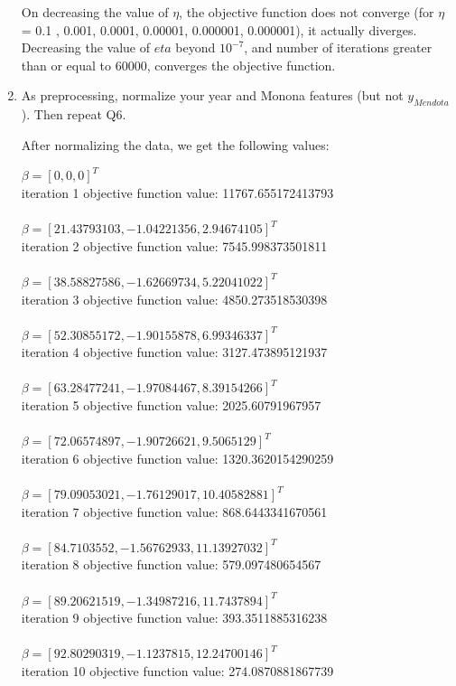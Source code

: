 \documentclass[a4paper]{article}
\theoremstyle{definition}
\newenvironment{soln}{
    \leavevmode\color{blue}\ignorespaces
}{}
\begin{document}
\begin{enumerate}
\begin{soln}
On decreasing the value of $\eta$, the objective function does not converge (for $\eta$ = 0.1 , 0.001, 0.0001, 0.00001, 0.000001, 0.000001), it actually diverges. Decreasing the value of $eta$ beyond $10^{-7}$, and number of iterations greater than or equal to 60000, converges the objective function.
	
\end{soln}

\item
As preprocessing, normalize your year and Monona features (but not $y_{Mendota}$).
Then repeat Q6.

\begin{soln}

After normalizing the data, we get the following values:

$\beta = [0,0,0]^T$\\
iteration 1 objective function value: 11767.655172413793\\
\\
$\beta = [21.43793103, -1.04221356,  2.94674105]^T$\\
iteration 2 objective function value:  7545.998373501811\\
\\
$\beta = [38.58827586, -1.62669734,  5.22041022]^T$\\
iteration 3 objective function value:  4850.273518530398\\
\\
$\beta = [52.30855172, -1.90155878,  6.99346337]^T$\\
iteration 4 objective function value:  3127.473895121937\\
\\
$\beta = [63.28477241, -1.97084467,  8.39154266]^T$\\
iteration 5 objective function value:  2025.60791967957\\
\\
$\beta = [72.06574897, -1.90726621,  9.5065129 ]^T$\\
iteration 6 objective function value:  1320.3620154290259\\
\\
$\beta = [79.09053021, -1.76129017, 10.40582881]^T$\\
iteration 7 objective function value:  868.6443341670561\\
\\
$\beta = [84.7103552,  -1.56762933, 11.13927032]^T$\\
iteration 8 objective function value:  579.097480654567\\
\\
$\beta = [89.20621519, -1.34987216, 11.7437894 ]^T$\\
iteration 9 objective function value:  393.3511885316238\\
\\
$\beta = [92.80290319, -1.1237815,  12.24700146]^T$\\
iteration 10 objective function value:  274.0870881867739\\


\end{soln}
\end{enumerate}
\end{document}
